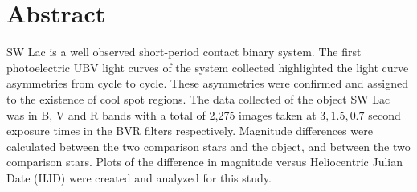 \section{Abstract}
\label{sec:abstract}

SW Lac is a well observed short-period contact binary system. The first photoelectric 
UBV light curves of the system collected highlighted the light curve asymmetries from 
cycle to cycle. These asymmetries were confirmed and assigned to the existence of cool 
spot regions. The data collected of the object SW Lac was in B, V and R bands with a total 
of 2,275 images taken at $3, 1.5, 0.7$ second exposure times in the BVR filters respectively.
 Magnitude differences were calculated between the two comparison stars and the object, 
 and between the two comparison stars. Plots of the difference in magnitude versus Heliocentric Julian Date (HJD) were created and analyzed for this study.
